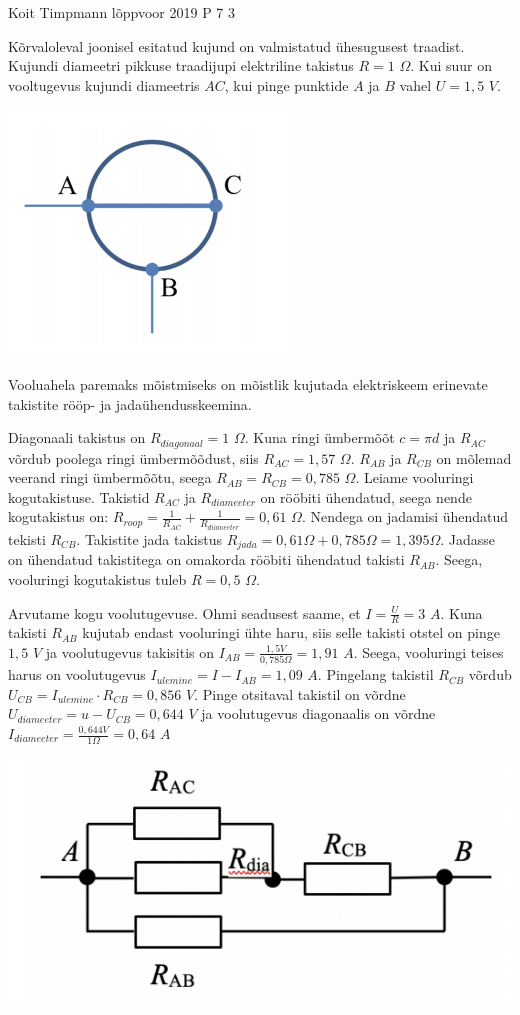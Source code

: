 {Koit Timpmann} %
{lõppvoor} %
{2019} %
{P 7} %
{3} %
{

\ifStatement
Kõrvaloleval joonisel esitatud kujund on valmistatud ühesugusest traadist. Kujundi diameetri pikkuse traadijupi elektriline takistus $R = 1$ $\Omega$. Kui suur on vooltugevus kujundi diameetris $AC$, kui pinge punktide $A$ ja $B$ vahel $U = 1,5$ $V$. 
\begin{center}
	\includegraphics[width=0.5\linewidth]{2019-v3p-07-yl.png}
\end{center}
\fi

\ifHint
Vooluahela paremaks mõistmiseks on mõistlik kujutada elektriskeem erinevate takistite rööp- ja jadaühendusskeemina.
\fi

\ifSolution
Diagonaali takistus on $R_{diagonaal} = 1$ $\Omega$.
Kuna ringi ümbermõõt $c = \pi d$ ja $R_{AC}$ võrdub poolega ringi ümbermõõdust, siis $R_{AC} = 1,57$ $\Omega$.
$R_{AB}$ ja $R_{CB}$ on mõlemad veerand ringi ümbermõõtu, seega $R_{AB} = R_{CB} = 0,785$ $\Omega$.
Leiame vooluringi kogutakistuse. Takistid $R_{AC}$ ja $R_{diameeter}$ on rööbiti ühendatud, seega nende kogutakistus on:
$R_{roop} = \frac{1}{R_{AC}} + \frac{1}{R_{diameeter}} = 0,61$ $\Omega$.
Nendega on jadamisi ühendatud tekisti $R_{CB}$. Takistite jada takistus $R_{jada} = 0,61 \Omega + 0,785 \Omega = 1,395 \Omega$.
Jadasse on ühendatud takistitega on omakorda rööbiti ühendatud takisti $R_{AB}$. Seega, vooluringi kogutakistus tuleb $R = 0,5$ $\Omega$.

Arvutame kogu voolutugevuse. Ohmi seadusest saame, et 
$I = \frac{U}{R} = 3$ $A$.
Kuna takisti $R_{AB}$ kujutab endast vooluringi ühte haru, siis selle takisti otstel on pinge $1,5$ $V$ ja voolutugevus takisitis on $I_{AB} = \frac{1,5V}{0,785 \Omega} = 1,91$ $A$.
Seega, vooluringi teises harus on voolutugevus 
$I_{ulemine} = I - I_{AB} = 1,09$ $A$.
Pingelang takistil $R_{CB}$ võrdub $U_{CB} = I_{ulemine} \cdot R_{CB} = 0,856 $ $V$.
Pinge otsitaval takistil on võrdne $U_{diameeter} = u- U_{CB} = 0,644$ $V$ ja voolutugevus diagonaalis on võrdne
$I_{diameeter} = \frac{0,644V}{1 \Omega} = 0,64$ $A$
\begin{center}
	\includegraphics[width=0.5\linewidth]{2019-v3p-07-lah.png}
\end{center}
\fi
}